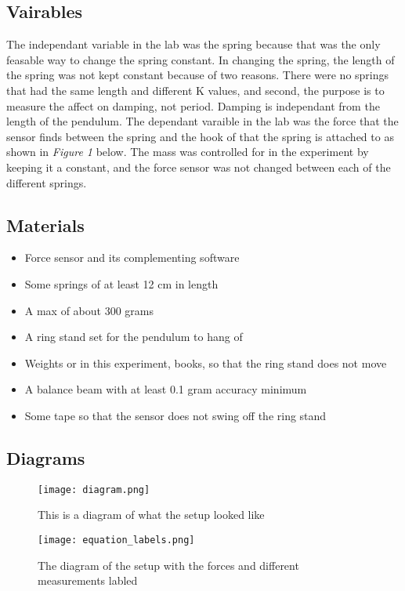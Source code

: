 \documentclass{report}
\begin{document}
\subsection*{Vairables}
\indent The independant variable in the lab was the spring because that was the only feasable way to change the spring constant. In changing the spring, the length of the spring was not kept constant because of two reasons. There were no springs that had the same length and different K values, and second, the purpose is to measure the affect on damping, not period. Damping is independant from the length of the pendulum. The dependant varaible in the lab was the force that the sensor finds between the spring and the hook of that the spring is attached to as shown in \textit{Figure 1} below. The mass was controlled for in the experiment by keeping it a constant, and the force sensor was not changed between each of the different springs.

\subsection*{Materials}
\begin{itemize}
\item Force sensor and its complementing software
\item Some springs of at least 12 cm in length
\item A max of about 300 grams
\item A ring stand set for the pendulum to hang of
\item Weights or in this experiment, books, so that the ring stand does not move
\item A balance beam with at least 0.1 gram accuracy minimum
\item Some tape so that the sensor does not swing off the ring stand
\end{itemize}

\subsection*{Diagrams}
\begin{figure}[h]
\texttt{[image: diagram.png]}
\caption{This is a diagram of what the setup looked like}
\end{figure}
\begin{figure}[h!]
\texttt{[image: equation\_labels.png]}
\caption{The diagram of the setup with the forces and different measurements labled}
\end{figure}
\end{document}
